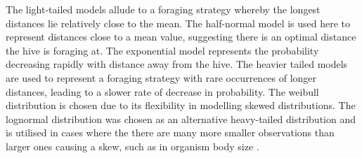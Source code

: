 \documentclass[11pt]{article}
\begin{document}
\begin{linenumbers}
The light-tailed models allude to a foraging strategy whereby the longest distances lie relatively close to the mean. The half-normal model is used here to represent distances close to a mean value, suggesting there is an optimal distance the hive is foraging at. The exponential model represents the probability decreasing rapidly with distance away from the hive. The heavier tailed models are used to represent a foraging strategy with rare occurrences of longer distances, leading to a slower rate of decrease in probability. The weibull distribution is chosen due to its flexibility in modelling skewed distributions. The lognormal distribution was chosen as an alternative heavy-tailed distribution and is utilised in cases where the there are many more smaller observations than larger ones causing a skew, such as in organism body size \citep{Packard2014}.\par  

\end{linenumbers}
\end{document}
